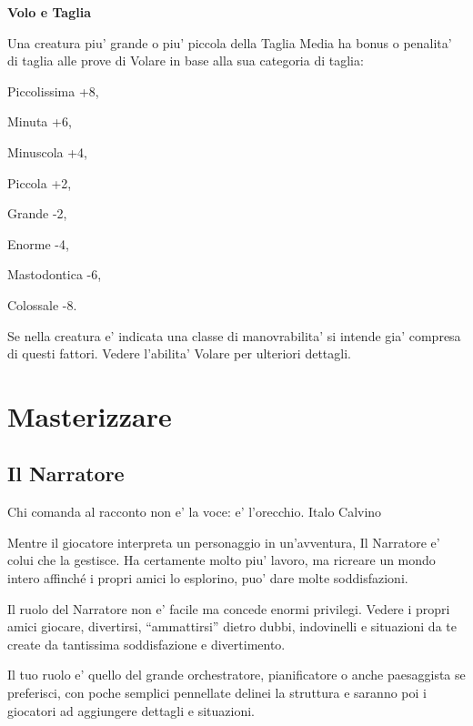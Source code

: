 \documentclass[a4paper,11pt,twoside,openany]{dndbook}
\begin{document}
\textbf{Volo e Taglia}

Una creatura piu' grande o piu' piccola della Taglia Media ha bonus o penalita' di taglia alle prove di Volare in base alla sua categoria di taglia:

Piccolissima +8,

Minuta +6,

Minuscola +4,

Piccola +2,

Grande -2,

Enorme -4,

Mastodontica -6,

Colossale -8.

Se nella creatura e' indicata una classe di manovrabilita' si intende gia' compresa di questi fattori. Vedere l'abilita' Volare per ulteriori dettagli.

\pagebreak

\section{Masterizzare}

\label{masterizzare}


\subsection{Il Narratore}

\begin{quotebox}
{Chi comanda al racconto non e' la voce: e' l'orecchio. Italo Calvino}
\end{quotebox}


\label{il-narratore}

Mentre il giocatore interpreta un personaggio in un'avventura, Il Narratore e' colui che la gestisce. Ha certamente molto piu' lavoro, ma ricreare un mondo intero affinché i propri amici lo esplorino, puo' dare molte soddisfazioni.

Il ruolo del Narratore non e' facile ma concede enormi privilegi. Vedere i propri amici giocare, divertirsi, ``ammattirsi'' dietro dubbi, indovinelli e situazioni da te create da tantissima soddisfazione e divertimento.

Il tuo ruolo e' quello del grande orchestratore, pianificatore o anche paesaggista se preferisci, con poche semplici pennellate delinei la struttura e saranno poi i giocatori ad aggiungere dettagli e situazioni.
\end{document}

